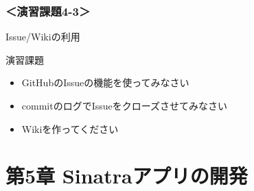 \documentclass[t, aspectratio=169]{beamer}
\begin{document}
\section{＜演習課題4-3＞}
\label{sec-4-6}
\begin{frame}[label=sec-4-6-1]{Issue/Wikiの利用}
\begin{block}{演習課題}
\begin{itemize}
\item GitHubのIssueの機能を使ってみなさい
\item commitのログでIssueをクローズさせてみなさい
\item Wikiを作ってください
\end{itemize}
\end{block}
\end{frame}

\part{第5章 Sinatraアプリの開発}
\label{sec-5}
\end{document}
